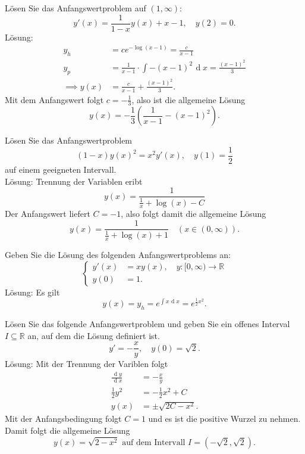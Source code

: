 \documentclass[parskip=full]{scrartcl}
\DeclareMathOperator{\diff}{\mathop{}\!\mathrm{d}}
\begin{document}
Lösen Sie das Anfangswertproblem auf $(1, \infty)$:
\begin{displaymath}
  y'(x) = \frac{1}{1 - x} y(x) + x - 1, \quad y(2) = 0.
\end{displaymath}
Lösung:
\begin{align*}
  y_h &= ce^{- \log(x - 1)} = \frac{c}{x - 1}\\
  y_p &= \frac{1}{x - 1} \cdot \int -(x - 1)^2 \diff x = \frac{(x - 1)^2}{3}\\
  \implies y(x) &= \frac{c}{x - 1} + \frac{(x-1)^2}{3}.
\end{align*}
Mit dem Anfangswert folgt $c = -\frac{1}{3}$, also ist die allgemeine Lösung
\begin{displaymath}
  y(x) = -\frac{1}{3}\left(\frac{1}{x - 1} - (x - 1)^2\right).
\end{displaymath}

Lösen Sie das Anfangswertproblem
\begin{displaymath}
  (1 - x)y(x)^2 = x^2 y'(x), \quad y(1) = \frac{1}{2}
\end{displaymath}
auf einem geeigneten Intervall.\\
Lösung: Trennung der Variablen eribt
\begin{displaymath}
  y(x) = \frac{1}{\frac{1}{x} + \log(x) - C}
\end{displaymath}
Der Anfangswert liefert $C = -1$, also folgt damit die allgemeine Lösung
\begin{displaymath}
  y(x) = \frac{1}{\frac{1}{x} + \log(x) + 1} \quad (x \in (0, \infty)).
\end{displaymath}

Geben Sie die Lösung des folgenden Anfangswertproblems an:
\begin{displaymath}
  \begin{cases}
    y'(x) &= xy(x), \quad y : [0,\infty) \to \mathbb{R}\\
    y(0) &= 1.
  \end{cases}
\end{displaymath}
Lösung:
Es gilt
\begin{displaymath}
  y(x) = y_h = e^{\int x \diff x} = e^{\frac{1}{2} x^2}.  
\end{displaymath}

Lösen Sie das folgende Anfangswertproblem und geben Sie ein offenes Interval $I \subseteq \mathbb{R}$ an, auf dem die Lösung definiert ist.
\begin{displaymath}
  y' = -\frac{x}{y}, \quad y(0) = \sqrt{2}.
\end{displaymath}
Lösung:
Mit der Trennung der Variblen folgt
\begin{align*}
  \frac{\diff y}{\diff x} &= -\frac{x}{y}\\
  \frac{1}{2}y^2 &= -\frac{1}{2} x^2 + C\\
  y(x) &= \pm \sqrt{2C - x^2}.
\end{align*}
Mit der Anfangsbedingung folgt $C = 1$ und es ist die positive Wurzel zu nehmen.
Damit folgt die allgemeine Lösung
\begin{displaymath}
  y(x) = \sqrt{2 - x^2} \text{ auf dem Intervall } I = (-\sqrt{2}, \sqrt{2}).
\end{displaymath}
\end{document}
